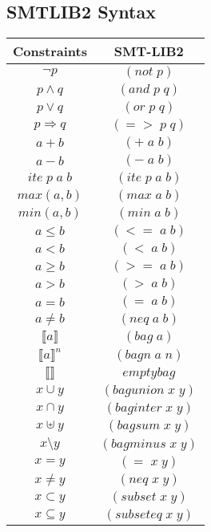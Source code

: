 \clearpage
\begin{appendices}
\chapter{SMTLIB2 Syntax}
\begin{center}
\begin{tabular}{|c|c|}
  \hline
  Constraints & SMT-LIB2\\
  \hline
  $\lnot p $ & $(not \;p)$ \\
  \hline
  $p\wedge q$ & $(and \;p \;q)$ \\
  \hline
  $p \vee q$ & $(or \;p \;q)$ \\
  \hline
  $p\Rightarrow q$ & $(=> \;p \;q)$ \\
  \hline
  $a+b$ & $(+\;a\;b)$ \\
  \hline
  $a-b$ & $(-\;a\;b)$ \\
  \hline
  $ite\; p\; a\; b$ & $(ite\;p\;a\;b)$ \\
  \hline
  $max(a,b)$ & $(max\;a\;b)$ \\
  \hline
  $min(a,b)$ & $(min\;a\;b)$ \\
  \hline
  $a\leq b$ & $(<= \;a\;b)$ \\
  \hline
  $a < b$ & $(< \;a\;b)$ \\
  \hline
  $a\geq b$ & $(>= \;a\;b)$ \\
  \hline
  $a > b$ & $(> \;a\;b)$ \\
  \hline
  $a = b$ & $(= \;a\;b)$ \\
  \hline
  $a\neq b$ & $(neq \;a\;b)$ \\
  \hline
  $\llbracket a \rrbracket$ & $(bag \;a)$ \\
  \hline
  $\llbracket a \rrbracket^{n}$ & $(bagn \;a \;n)$ \\
  \hline
  $\llbracket \rrbracket$ & $emptybag$ \\
  \hline
  $x \cup y$ & $(bagunion \;x \;y)$ \\
  \hline
  $x \cap y$ & $(baginter \;x \;y)$ \\
  \hline
  $x \uplus y$ & $(bagsum \;x \;y)$ \\
  \hline
  $x \setminus y$ & $(bagminus \;x \;y)$ \\
  \hline
  $x = y$ & $(= \;x \;y)$ \\
  \hline
  $x \neq y$ & $(neq \;x \;y)$ \\
  \hline
  $x \subset y$ & $(subset \;x \;y)$ \\
  \hline
  $x \subseteq y$ & $(subseteq \;x \;y)$ \\

\end{tabular}
\end{center}
\end{appendices}
